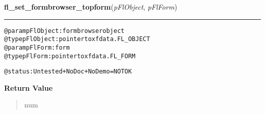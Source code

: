 \hspace{.8\funcindent}\begin{boxedminipage}{\funcwidth}

    \raggedright \textbf{fl\_set\_formbrowser\_topform}(\textit{pFlObject}, \textit{pFlForm})

    \vspace{-1.5ex}

    \rule{\textwidth}{0.5\fboxrule}
\setlength{\parskip}{2ex}
\begin{alltt}
@param pFlObject: formbrowser object
@type pFlObject: pointer to xfdata.FL\_OBJECT
@param pFlForm: form
              @type pFlForm: pointer to xfdata.FL\_FORM

@status: Untested + NoDoc + NoDemo = NOT OK
\end{alltt}

\setlength{\parskip}{1ex}
      \textbf{Return Value}
    \vspace{-1ex}

      \begin{quote}
      num

      \end{quote}

    \end{boxedminipage}

    \label{xformslib:flformbrowser:fl_set_formbrowser_topform_bynumber}

    \vspace{0.5ex}

